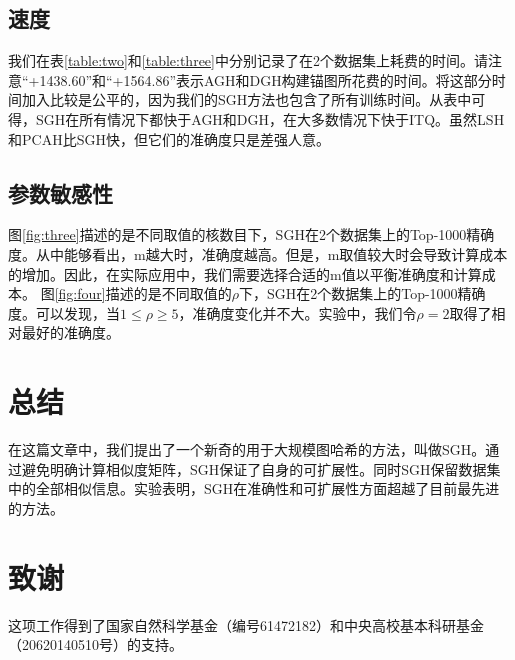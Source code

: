\documentclass{article}
\begin{document}
\subsection{速度}
我们在表\ref{table:two}和\ref{table:three}中分别记录了在2个数据集上耗费的时间。请注意“+1438.60”和“+1564.86”表示AGH和DGH构建锚图所花费的时间。将这部分时间加入比较是公平的，因为我们的SGH方法也包含了所有训练时间。从表中可得，SGH在所有情况下都快于AGH和DGH，在大多数情况下快于ITQ。虽然LSH和PCAH比SGH快，但它们的准确度只是差强人意。


\subsection{参数敏感性}
图\ref{fig:three}描述的是不同取值的核数目下，SGH在2个数据集上的Top-1000精确度。从中能够看出，m越大时，准确度越高。但是，m取值较大时会导致计算成本的增加。因此，在实际应用中，我们需要选择合适的m值以平衡准确度和计算成本。
图\ref{fig:four}描述的是不同取值的$\rho$下，SGH在2个数据集上的Top-1000精确度。可以发现，当$1 \leq \rho \geq 5$，准确度变化并不大。实验中，我们令$\rho =2$取得了相对最好的准确度。

\section{总结}
在这篇文章中，我们提出了一个新奇的用于大规模图哈希的方法，叫做SGH。通过避免明确计算相似度矩阵，SGH保证了自身的可扩展性。同时SGH保留数据集中的全部相似信息。实验表明，SGH在准确性和可扩展性方面超越了目前最先进的方法。

\section{致谢}
这项工作得到了国家自然科学基金（编号61472182）和中央高校基本科研基金（20620140510号）的支持。


\end{document}
